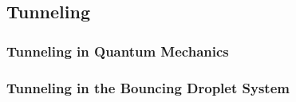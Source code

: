     



\subsection{Tunneling}

    \subsubsection{Tunneling in Quantum Mechanics}
    
    \subsubsection{Tunneling in the Bouncing Droplet System}

